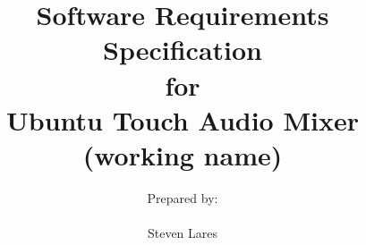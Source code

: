 
\def\Company{}
\def\Institute{\textit{}}
\def\Course{\textit{}}
\def\Module{\textit{ }}
\def\Docent{\textit{}}
\def\Assistant{\textit{}}

\def\BoldTitle{Software Requirements Specification}

\def\Subtitle{for \\ Ubuntu Touch Audio Mixer (working name) \\}
\def\Authors{Prepared by:\\\\ Steven Lares} 


\title{\textbf{\BoldTitle}\\\Subtitle}
\author{\Authors \\ \\ \\ \Institute\\ \Course\\ \Module\\ \Docent\\ \Assistant}
\date{}

